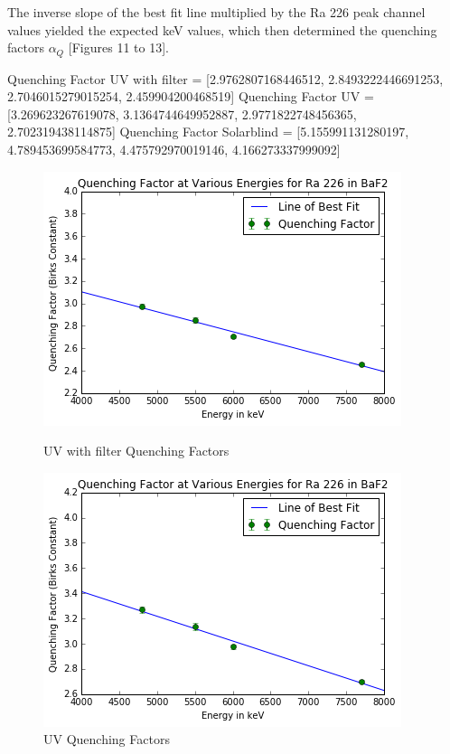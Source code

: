 \documentclass{article}
\begin{document}
The inverse slope of the best fit line multiplied by the Ra 226 peak channel values yielded the expected keV values, which then determined the quenching factors $\alpha_Q$ [Figures 11 to 13]. 

\setlength{\parskip}{2em}
\noindent
Quenching Factor UV with filter = [2.9762807168446512, 2.8493222446691253, 2.7046015279015254, 2.459904200468519]
\noindent
Quenching Factor UV = [3.269623267619078, 3.1364744649952887, 2.9771822748456365, 2.702319438114875]
\noindent
Quenching Factor Solarblind = [5.155991131280197, 4.789453699584773, 4.475792970019146, 4.166273337999092]

\begin{figure}[H]
  \centering
  \begin{minipage}[b]{0.4\textwidth}
    \includegraphics[width=\textwidth]{qff.png}
    \caption{UV with filter Quenching Factors}
  \end{minipage}
  \hfill
  \begin{minipage}[b]{0.4\textwidth}
    \includegraphics[width=\textwidth]{qfuv.png}
    \caption{UV Quenching Factors}
  \end{minipage}
\end{figure}
 
\end{document}

